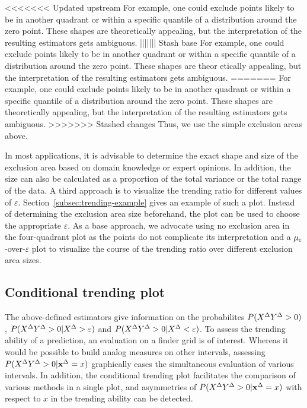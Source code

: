 <<<<<<< Updated upstream
For example, one could exclude points likely to be in another quadrant or within a specific quantile of a distribution around the zero point. 
These shapes are theoretically appealing, but the interpretation of the resulting estimators gets ambiguous.
||||||| Stash base
For example, one could exclude points likely to be in another quadrant or within a specific quantile of a distribution around the zero point. 
These shapes are theor etically appealing, but the interpretation of the resulting estimators gets ambiguous.
=======
For example, one could exclude points likely to be in another quadrant or within a specific quantile of a distribution around the zero point. 
These shapes are theoretically appealing, but the interpretation of the resulting estimators gets ambiguous.
>>>>>>> Stashed changes
Thus, we use the simple exclusion areas above.

In most applications, it is advisable to determine the exact shape and size of the exclusion area based on domain knowledge or expert opinions.
In addition, the size can also be calculated as a proportion of the total variance or the total range of the data.
A third approach is to visualize the trending ratio for different values of $\varepsilon$.
Section~\ref{subsec:trending-example} gives an example of such a plot.
Instead of determining the exclusion area size beforehand, the plot can be used to choose the appropriate $\varepsilon$.
As a base approach, we advocate using no exclusion area in the four-quadrant plot as the points do not complicate its interpretation and a $\mu_{\varepsilon}$-over-$\varepsilon$ plot to visualize the course of the trending ratio over different exclusion area sizes.


\subsection{Conditional trending plot}\label{subsec:trending-cond-prob}
The above-defined estimators give information on the probabilites $P(X^{\Delta} Y^{\Delta} > 0)$, $P(X^{\Delta} Y^{\Delta} > 0 | X^{\Delta} > \varepsilon)$ and $P(X^{\Delta} Y^{\Delta} > 0 | X^{\Delta} < \varepsilon)$.
To assess the trending ability of a prediction, an evaluation on a finder grid is of interest.
Whereas it would be possible to build analog measures on other intervals, assessing $P(X^{\Delta} Y^{\Delta} > 0 | \mathbf{x}^{\Delta} = x)$ graphically eases the simultaneous evaluation of various intervals.
In addition, the conditional trending plot facilitates the comparison of various methods in a single plot, and asymmetries of $P(X^{\Delta} Y^{\Delta} > 0 | \mathbf{x}^{\Delta} = x)$ with respect to $x$ in the trending ability can be detected.


